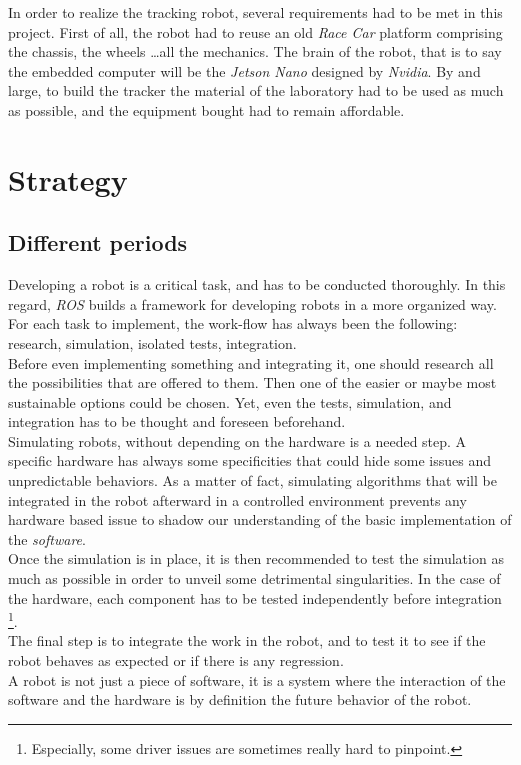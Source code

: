 		In order to realize the tracking robot, several requirements had to be met in this
		project. First of all, the robot had to reuse an old \textit{Race Car} platform comprising
		the chassis, the wheels \dots all the mechanics. The brain of the robot, that is to say
		the embedded computer will be the \textit{Jetson Nano} designed by \textit{Nvidia}. By and
		large, to build the tracker the material of the laboratory had to be used as much as 
		possible, and the equipment bought had to remain affordable.
	
	\section{Strategy}
	
		\subsection{Different periods}

		Developing a robot is a critical task, and has to be conducted thoroughly. 
		In this regard, \textit{ROS} builds a framework for developing 
		robots in a more organized way. For each task to implement, 
		the work-flow has always been the following: research, simulation, isolated 
		tests, integration.
		\\\indent Before even implementing something and integrating it, one should 
		research all the possibilities that are offered to them. Then one of the 
		easier or maybe most sustainable options could be chosen. Yet, even the
		tests, simulation, and integration has to be thought and foreseen beforehand.
		\\\indent Simulating robots, without depending on the hardware is
		a needed step.	 A specific hardware has always some specificities that
		could hide some issues and unpredictable behaviors. As a matter of fact, 
		simulating algorithms that will be integrated in the robot afterward in 
		a controlled environment prevents any hardware based issue to shadow
		our understanding of the basic implementation of
		the \textit{software}.
		\\\indent Once the simulation is in place, it is then 
		recommended to test the simulation as much as possible in order
		to unveil some detrimental singularities. In the case of the hardware, 
		each component has to be tested independently before integration
		\footnote{Especially, some driver issues are sometimes really 
		hard to pinpoint.}.
		\\\indent The final step is to integrate the work in the robot, and
		to test it to see if the robot behaves as expected or if there 
		is any regression.
		\\\indent A robot is not just a piece of software, it is a system 
		where the interaction of the software and the hardware is by 
		definition the future behavior of the robot.
		

